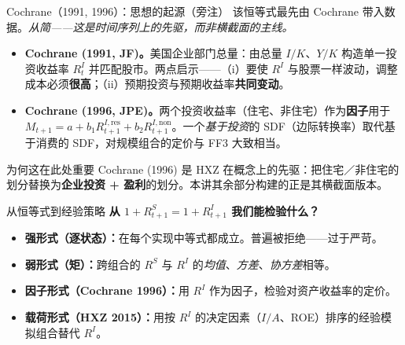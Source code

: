 \documentclass{beamer}
\begin{document}
\begin{frame}{Cochrane（1991, 1996）：思想的起源（旁注）}
	\small
	该恒等式最先由 Cochrane 带入数据。\textit{从简——这是时间序列上的先驱，而非横截面的主线。}
	\begin{itemize}
		\item \textbf{Cochrane (1991, JF)。}美国企业部门总量：由总量 $I/K$、$Y/K$ 构造单一投资收益率 $R^I_t$ 并匹配股市。两点启示——（i）要使 $R^I$ 与股票一样波动，调整成本必须\textbf{很高}；（ii）预期投资与预期收益率\textbf{共同变动}。
		\item \textbf{Cochrane (1996, JPE)。}两个投资收益率（住宅、非住宅）作为\textbf{因子}用于 $M_{t+1}=a+b_1R^{I,\text{res}}_{t+1}+b_2R^{I,\text{non}}_{t+1}$。一个\textit{基于投资}的 SDF（边际转换率）取代基于消费的 SDF，对规模组合的定价与 FF3 大致相当。
	\end{itemize}
	\begin{block}{为何这在此处重要}
		Cochrane (1996) 是 HXZ 在概念上的先驱：把住宅／非住宅的划分替换为\textbf{企业投资 + 盈利}的划分。本讲其余部分构建的正是其横截面版本。
	\end{block}
\end{frame}

\begin{frame}{从恒等式到经验策略}
    \textbf{从 $1+R^S_{t+1} = 1+R^I_{t+1}$ 我们能检验什么？}
    \begin{itemize}
        \item \textbf{强形式（逐状态）：}在每个实现中等式都成立。普遍被拒绝——过于严苛。
        \item \textbf{弱形式（矩）：}跨组合的 $R^S$ 与 $R^I$ 的\textit{均值}、\textit{方差}、\textit{协方差}相等。
        \item \textbf{因子形式（Cochrane 1996）：}用 $R^I$ 作为因子，检验对资产收益率的定价。
        \item \textbf{载荷形式（HXZ 2015）：}用按 $R^I$ 的决定因素（$I/A$、ROE）排序的经验模拟组合替代 $R^I$。
    \end{itemize}

    \vspace{0.15cm}
    \begin{center}
        \small
    \end{center}
\end{frame}
\end{document}
